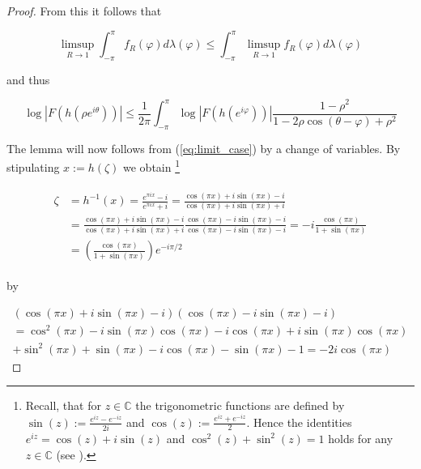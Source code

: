 \begin{proof}
From this it follows that

\begin{equation*}
	\limsup_{R \to 1}\int_{-\pi}^\pi f_R(\varphi)d\lambda(\varphi) \leqslant \int_{-\pi}^\pi \limsup_{R \to 1} f_R(\varphi)d\lambda(\varphi)
\end{equation*}

and thus

\begin{equation}
	\log\left| F( h( \rho e^{i\theta} ) )\right| \leqslant \frac{1}{2\pi} \int_{-\pi}^\pi \log\left| F( h( e^{i\varphi}))\right| \frac{1 - \rho^2}{1 - 2\rho\cos\left( \theta - \varphi \right) + \rho^2}	
	\label{eq:limit_case}
\end{equation}

The lemma will now follows from (\ref{eq:limit_case}) by a change of variables. By stipulating $x := h\left( \zeta \right)$ we obtain \footnote{
		Recall, that for $z \in \mathbb{C}$ the trigonometric functions are defined by $\sin(z) := \frac{e^{iz} - e^{-iz}}{2i}$ and $\cos(z) := \frac{e^{iz} + e^{-iz}}{2}$. Hence the identities $e^{iz} = \cos(z) + i\sin(z)$ and $\cos^2(z) + \sin^2(z) = 1$ holds for any $z \in \mathbb{C}$ (see \cite[42--44]{ahlfors:complex_analysis:1979}).	
	}

\begin{gather}
	\begin{aligned}
		\zeta &= h^{-1}(x) = \frac{e^{\pi i x}- i}{e^{\pi i x} + i} = \frac{\cos(\pi x) + i\sin(\pi x) - i}{\cos(\pi x) + i\sin(\pi x) + i}\\
		&= \frac{\cos(\pi x) + i\sin(\pi x) - i}{\cos(\pi x) + i\sin(\pi x) + i}\frac{\cos(\pi x) - i\sin(\pi x) - i}{\cos(\pi x) - i\sin(\pi x) - i} = -i \frac{\cos(\pi x)}{1 + \sin(\pi x)}\\
		&= \left( \frac{\cos(\pi x)}{1 + \sin(\pi x)} \right)e^{-i\pi/2}
	\end{aligned}
	\label{eq:radius_angle}
\end{gather}

by

\begin{multline*}
	\left(\cos(\pi x) + i\sin(\pi x) - i\right)\left(\cos(\pi x) - i\sin(\pi x) - i\right)\\ = \cos^2(\pi x) - i\sin(\pi x)\cos(\pi x)	
		-i\cos(\pi x) + i\sin(\pi x)\cos(\pi x)\\
	 	+ \sin^2(\pi x) + \sin(\pi x) - i \cos(\pi x) - \sin(\pi x) - 1 = -2i \cos(\pi x)  
\end{multline*}


\end{proof}
